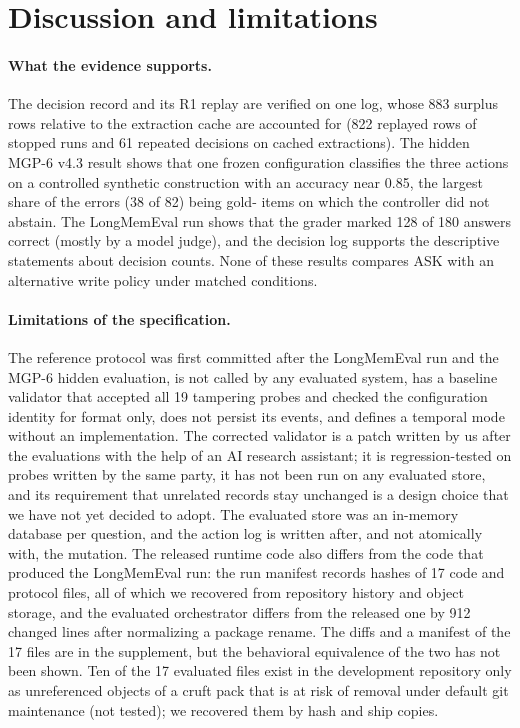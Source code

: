 \section{Discussion and limitations}
\label{sec:discussion}
\paragraph{What the evidence supports.} The decision record and its R1 replay are verified on one log, whose 883 surplus rows relative to the extraction cache are accounted for (822 replayed rows of stopped runs and 61 repeated decisions on cached extractions). The hidden MGP-6 v4.3 result shows that one frozen configuration classifies the three actions on a controlled synthetic construction with an accuracy near 0.85, the largest share of the errors (38 of 82) being gold-\abstain{} items on which the controller did not abstain. The LongMemEval run shows that the grader marked 128 of 180 answers correct (mostly by a model judge), and the decision log supports the descriptive statements about decision counts. None of these results compares ASK with an alternative write policy under matched conditions.

\paragraph{Limitations of the specification.} The reference protocol was first committed after the LongMemEval run and the MGP-6 hidden evaluation, is not called by any evaluated system, has a baseline validator that accepted all 19 tampering probes and checked the configuration identity for format only, does not persist its events, and defines a temporal mode without an implementation. The corrected validator is a patch written by us after the evaluations with the help of an AI research assistant; it is regression-tested on probes written by the same party, it has not been run on any evaluated store, and its requirement that unrelated records stay unchanged is a design choice that we have not yet decided to adopt. The evaluated store was an in-memory database per question, and the action log is written after, and not atomically with, the mutation. The released runtime code also differs from the code that produced the LongMemEval run: the run manifest records hashes of 17 code and protocol files, all of which we recovered from repository history and object storage, and the evaluated orchestrator differs from the released one by 912 changed lines after normalizing a package rename. The diffs and a manifest of the 17 files are in the supplement, but the behavioral equivalence of the two has not been shown. Ten of the 17 evaluated files exist in the development repository only as unreferenced objects of a cruft pack that is at risk of removal under default git maintenance (not tested); we recovered them by hash and ship copies.

